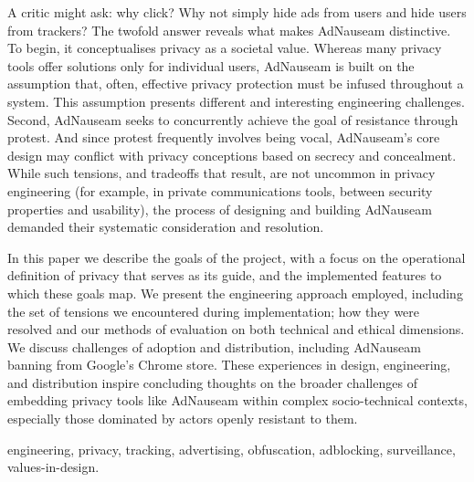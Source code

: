 \documentclass[conference]{IEEEtran}
\begin{document}
A critic might ask: why click? Why not simply hide ads from users and hide users from trackers? The twofold answer reveals what makes AdNauseam distinctive. To begin, it conceptualises privacy as a societal value. Whereas many privacy tools offer solutions only for individual users, AdNauseam is built on the assumption that, often, effective privacy protection must be infused throughout a system. This assumption presents different and interesting engineering challenges. Second, AdNauseam seeks to concurrently achieve the goal of resistance through protest. And since protest frequently involves being vocal, AdNauseam's core design may conflict with privacy conceptions based on secrecy and concealment. While such tensions, and tradeoffs that result,  are not uncommon in privacy engineering (for example, in private communications tools, between security properties and usability), the process of designing and building AdNauseam demanded their systematic consideration and resolution.

In this paper we describe the goals of the project, with a focus on the operational definition of privacy that serves as its guide, and the implemented features to which these goals map. We present the engineering approach employed, including the set of tensions we encountered during implementation; how they were resolved and our methods of evaluation on both technical and ethical dimensions. We discuss challenges of adoption and distribution, including AdNauseam banning from Google's Chrome store. These experiences in design, engineering, and distribution inspire concluding thoughts on the broader challenges of embedding privacy tools like AdNauseam within complex socio-technical contexts, especially those dominated by actors openly resistant to them.

\vspace{5mm}

\begin{IEEEkeywords}
engineering, privacy, tracking, advertising, obfuscation, adblocking, surveillance, values-in-design.
\end{IEEEkeywords}

%
\IEEEpeerreviewmaketitle
\end{document}
